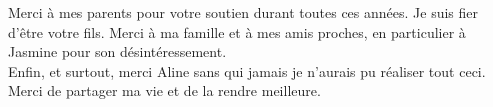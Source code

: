 Merci à mes parents pour votre soutien durant toutes ces années. Je suis fier 
d'être votre fils. Merci à ma famille et à mes amis proches, en particulier 
à Jasmine pour son désintéressement.\\

Enfin, et surtout, merci Aline sans qui jamais je n'aurais pu réaliser tout ceci.\\
Merci de partager ma vie et de la rendre meilleure.





